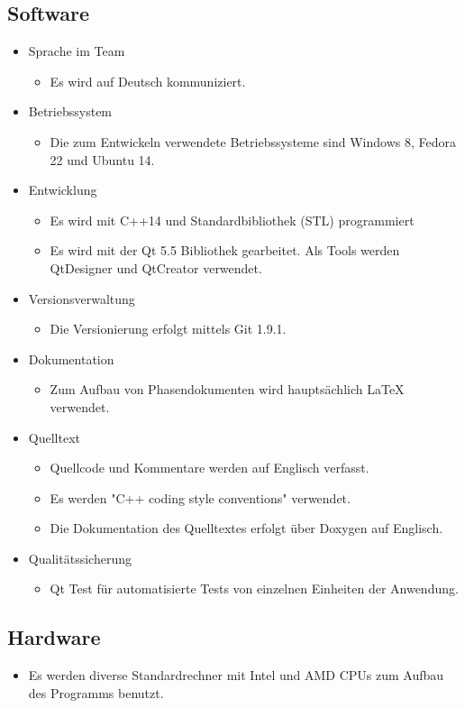 \subsection{Software}
\begin{itemize}
\item Sprache im Team
	\begin{itemize}[label={--}]
		\item Es wird auf Deutsch kommuniziert.
	\end{itemize}
\item Betriebssystem
	\begin{itemize}[label={--}]
		\item Die zum Entwickeln verwendete Betriebssysteme sind Windows 8, Fedora 22 und Ubuntu 14.
	\end{itemize}
\item Entwicklung
	\begin{itemize}[label={--}]
		\item Es wird mit C++14 und Standardbibliothek (STL) programmiert
		\item Es wird mit der Qt 5.5 Bibliothek gearbeitet. Als Tools werden QtDesigner und QtCreator verwendet.
	\end{itemize}
\item Versionsverwaltung
	\begin{itemize}[label={--}]
		\item Die Versionierung erfolgt mittels Git 1.9.1.
	\end{itemize}
\item Dokumentation
	\begin{itemize}[label={--}]
		\item Zum Aufbau von Phasendokumenten wird hauptsächlich LaTeX verwendet.
	\end{itemize}
\item Quelltext
	\begin{itemize}[label={--}]
		\item Quellcode und Kommentare werden auf Englisch verfasst.
		\item Es werden "C++ coding style conventions" verwendet.
		\item Die Dokumentation des Quelltextes erfolgt über Doxygen auf Englisch.
	\end{itemize}
\item Qualitätssicherung
	\begin{itemize}[label={--}]
		\item Qt Test für automatisierte Tests von einzelnen Einheiten der Anwendung.
	\end{itemize}

\end{itemize}

\subsection{Hardware}
\begin{itemize}
	\item Es werden diverse Standardrechner mit Intel und AMD CPUs zum Aufbau des Programms benutzt.
\end{itemize}
\pagebreak
